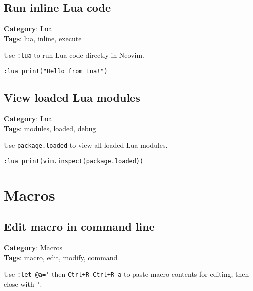{{{{{{{\section{Run inline Lua code}

\textbf{Category}: Lua\\ \textbf{Tags}: lua, inline, execute
\vspace{0.5cm}

Use {\footnotesize \Verb§:lua§} to run Lua code directly in Neovim.

\begin{Exa*}{}
\begin{Verbatim}[fontsize=\footnotesize, breaklines, breakanywhere]
:lua print("Hello from Lua!")
\end{Verbatim}
\end{Exa*}

\section{View loaded Lua modules}

\textbf{Category}: Lua\\ \textbf{Tags}: modules, loaded, debug
\vspace{0.5cm}

Use {\footnotesize \Verb§package.loaded§} to view all loaded Lua modules.

\begin{Exa*}{}
\begin{Verbatim}[fontsize=\footnotesize, breaklines, breakanywhere]
:lua print(vim.inspect(package.loaded))
\end{Verbatim}
\end{Exa*}

\chapter{Macros}
\section{Edit macro in command line}

\textbf{Category}: Macros\\ \textbf{Tags}: macro, edit, modify, command
\vspace{0.5cm}

Use {\footnotesize \Verb§:let @a='§} then {\footnotesize \Verb§Ctrl+R Ctrl+R a§} to paste macro contents for editing, then close with {\footnotesize \Verb§'§}.

}}}}}}}
